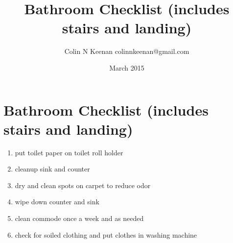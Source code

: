 \documentclass[12pt,letterpaper]{article}
\newcommand{\mytitle}{Bathroom Checklist (includes stairs and landing)}
\begin{document}
\title{\mytitle{}}
\author{Colin N Keenan colinnkeenan@gmail.com}
\date{March 2015}
\section*{\mytitle{}}
\begin{enumerate}
	\item put toilet paper on toilet roll holder
	\item cleanup sink and counter
	\item dry and clean spots on carpet to reduce odor
	\item wipe down counter and sink
	\item clean commode once a week and as needed
	\item check for soiled clothing and put clothes in washing machine
\end{enumerate}
\end{document}
